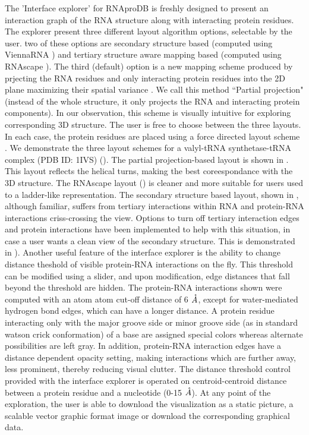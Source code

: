 The 'Interface explorer' for RNAproDB is freshly designed to present an interaction graph of the RNA structure along with interacting protein residues. The explorer present three different layout algorithm options, selectable by the user. two of these options are secondary structure based (computed using ViennaRNA \citep{Lorenz2011}) and tertiary structure aware mapping based (computed using RNAscape \citep{Mitra2024rnascape}). The third (default) option is a new mapping scheme produced by prjecting the RNA residues and only interacting protein residues into the 2D plane maximizing their spatial variance \citep{Pearson1901}. We call this method ``Partial projection" (instead of the whole structure, it only projects the RNA and interacting protein components). In our observation, this scheme is visually intuitive for exploring corresponding 3D structure. The user is free to choose between the three layouts. In each case, the protein residues are placed using a force directed layout scheme \citep{bostock2012fl}. We demonstrate the three layout schemes for a valyl-tRNA synthetase-tRNA complex (PDB ID: 1IVS) (). The partial projection-based layout is shown in . This layout reflects the helical turns, making the best coreespondance with the 3D structure. The RNAscape \citep{Mitra2024rnascape} layout () is cleaner and more suitable for users used to a ladder-like representation.  The secondary structure based layout, shown in , although familiar, suffers from tertiary interactions within RNA and protein-RNA interactions criss-crossing the view. Options to turn off tertiary interaction edges and protein interactions have been implemented to help with this situation, in case a user wants a clean view of the secondary structure. This is demonstrated in ). Another useful feature of the interface explorer is the ability to change distance theshold of visible protein-RNA interactions on the fly. This threshold can be modified using a slider, and upon modification, edge distances that fall beyond the threshold are hidden. The protein-RNA interactions shown were computed with an atom atom cut-off distance of 6 $\AA$, except for water-mediated hydrogen bond edges, which can have a longer distance. A protein residue interacting only with the major groove side or minor groove side (as in standard watson crick conformation) of a base are assigned special colors whereas alternate possibilities are left gray. In addition, protein-RNA interaction edges have a distance dependent opacity setting, making interactions which are further away, less prominent, thereby reducing visual clutter.
The distance threshold control provided with the interface explorer is operated on centroid-centroid distance between a protein residue and a nucleotide (0-15 $\AA$). At any point of the exploration, the user is able to download the visualization as a static picture, a scalable vector graphic format image or download the corresponding graphical data.

